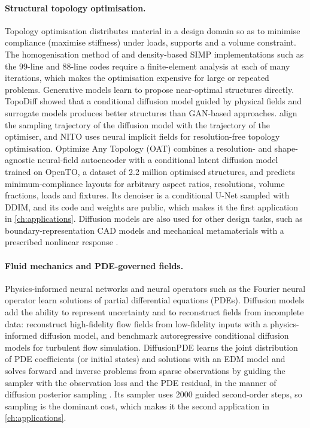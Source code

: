 \paragraph{Structural topology optimisation.} Topology optimisation distributes material in a design domain so as to minimise compliance (maximise stiffness) under loads, supports and a volume constraint. The homogenisation method of \citet{bendsoe1988generating} and density-based SIMP implementations such as the 99-line and 88-line codes \citep{sigmund2001,andreassen2011efficient} require a finite-element analysis at each of many iterations, which makes the optimisation expensive for large or repeated problems. Generative models learn to propose near-optimal structures directly. TopoDiff \citep{maze2023topodiff} showed that a conditional diffusion model guided by physical fields and surrogate models produces better structures than GAN-based approaches. \citet{giannone2023aligning} align the sampling trajectory of the diffusion model with the trajectory of the optimiser, and NITO \citep{nobari2024nito} uses neural implicit fields for resolution-free topology optimisation. Optimize Any Topology (OAT) \citep{nobari2025oat} combines a resolution- and shape-agnostic neural-field autoencoder with a conditional latent diffusion model trained on OpenTO, a dataset of 2.2 million optimised structures, and predicts minimum-compliance layouts for arbitrary aspect ratios, resolutions, volume fractions, loads and fixtures. Its denoiser is a conditional U-Net sampled with DDIM, and its code and weights are public, which makes it the first application in \cref{ch:applications}. Diffusion models are also used for other design tasks, such as boundary-representation CAD models \citep{xu2024brepgen} and mechanical metamaterials with a prescribed nonlinear response \citep{bastek2023inverse}.

\paragraph{Fluid mechanics and PDE-governed fields.} Physics-informed neural networks \citep{raissi2019pinn} and neural operators such as the Fourier neural operator \citep{li2021fno} learn solutions of partial differential equations (PDEs). Diffusion models add the ability to represent uncertainty and to reconstruct fields from incomplete data: \citet{shu2023physics} reconstruct high-fidelity flow fields from low-fidelity inputs with a physics-informed diffusion model, and \citet{kohl2023benchmarking} benchmark autoregressive conditional diffusion models for turbulent flow simulation. DiffusionPDE \citep{huang2024diffusionpde} learns the joint distribution of PDE coefficients (or initial states) and solutions with an EDM model and solves forward and inverse problems from sparse observations by guiding the sampler with the observation loss and the PDE residual, in the manner of diffusion posterior sampling \citep{chung2023dps}. Its sampler uses 2000 guided second-order steps, so sampling is the dominant cost, which makes it the second application in \cref{ch:applications}.

